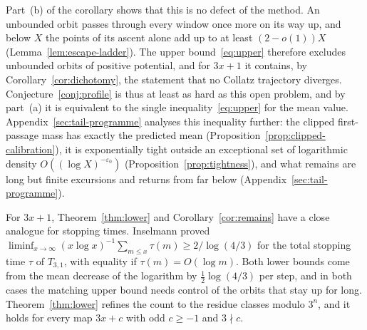 \documentclass[12pt]{amsart}
\theoremstyle{definition}
\theoremstyle{remark}
\begin{document}
Part~(b) of the corollary shows that this is no defect of the method. An unbounded orbit passes through every window once more on its way up, and below $X$ the points of its ascent alone add up to at least $(2-o(1))X$ (Lemma~\ref{lem:escape-ladder}). The upper bound~\eqref{eq:upper} therefore excludes unbounded orbits of positive potential, and for $3x+1$ it contains, by Corollary~\ref{cor:dichotomy}, the statement that no Collatz trajectory diverges. Conjecture~\ref{conj:profile} is thus at least as hard as this open problem, and by part~(a) it is equivalent to the single inequality~\eqref{eq:upper} for the mean value. Appendix~\ref{sec:tail-programme} analyses this inequality further: the clipped first-passage mass has exactly the predicted mean (Proposition~\ref{prop:clipped-calibration}), it is exponentially tight outside an exceptional set of logarithmic density $O((\log X)^{-\varepsilon_0})$ (Proposition~\ref{prop:tightness}), and what remains are long but finite excursions and returns from far below (Appendix~\ref{sec:tail-programme}).

For $3x+1$, Theorem~\ref{thm:lower} and Corollary~\ref{cor:remains} have a close analogue for stopping times. Inselmann \cite{Inselmann_2024} proved $\liminf_{x\to\infty}(x\log x)^{-1}\sum_{m\le x}\tau(m)\ge2/\log(4/3)$ for the total stopping time $\tau$ of $T_{3,1}$, with equality if $\tau(m)=O(\log m)$. Both lower bounds come from the mean decrease of the logarithm by $\frac12\log(4/3)$ per step, and in both cases the matching upper bound needs control of the orbits that stay up for long. Theorem~\ref{thm:lower} refines the count to the residue classes modulo $3^n$, and it holds for every map $3x+c$ with odd $c\ge-1$ and $3\nmid c$.
\end{document}
